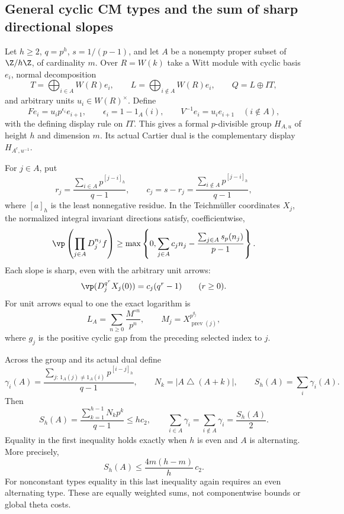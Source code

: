 \subsection{General cyclic CM types and the sum of sharp directional slopes}

\begin{theorem}\label{DP40}
Let $h\ge2$, $q=p^h$, $s=1/(p-1)$, and let $A$ be a nonempty proper subset of $\Z/h\Z$, of cardinality $m$. Over $R=W(k)$ take a Witt module with cyclic basis $e_i$, normal decomposition
\[
 T=\bigoplus_{i\in A}W(R)e_i,\qquad
 L=\bigoplus_{i\notin A}W(R)e_i,\qquad Q=L\oplus IT,
\]
and arbitrary units $u_i\in W(R)^\times$. Define
\[
 Fe_i=u_ip^{\epsilon_i}e_{i+1},\qquad
 \epsilon_i=1-1_A(i),\qquad
 V^{-1}e_i=u_ie_{i+1}\quad(i\notin A),
\]
with the defining display rule on $IT$. This gives a formal $p$-divisible group $H_{A,u}$ of height $h$ and dimension $m$. Its actual Cartier dual is the complementary display $H_{A^c,u^{-1}}$.

For $j\in A$, put
\[
 r_j=\frac{\sum_{i\in A}p^{[j-i]_h}}{q-1},\qquad
 c_j=s-r_j=\frac{\sum_{i\notin A}p^{[j-i]_h}}{q-1},
\]
where $[a]_h$ is the least nonnegative residue. In the Teichm\"uller coordinates $X_j$, the normalized integral invariant directions satisfy, coefficientwise,
\begin{equation}\label{eq:cyclicmixed}
 \vp\left(\prod_{j\in A}D_j^{n_j}f\right)
 \ge\max\left\{0,\sum_{j\in A}c_jn_j-
                   \frac{\sum_{j\in A}s_p(n_j)}{p-1}\right\}.
\end{equation}
Each slope is sharp, even with the arbitrary unit arrows:
\[
 \vp(D_j^{q^r}X_j(0))=c_j(q^r-1)\qquad(r\ge0).
\]
For unit arrows equal to one the exact logarithm is
\[
 L_A=\sum_{n\ge0}\frac{M^{\circ n}}{p^n},\qquad
 M_j=X_{\operatorname{prev}(j)}^{p^{g_j}},
\]
where $g_j$ is the positive cyclic gap from the preceding selected index to $j$.

Across the group and its actual dual define
\[
 \gamma_i(A)=\frac{\sum_{j:\,1_A(j)\ne1_A(i)}p^{[i-j]_h}}{q-1},
 \qquad N_k=|A\mathbin\triangle(A+k)|,\qquad
 S_h(A)=\sum_i\gamma_i(A).
\]
Then
\begin{equation}\label{eq:cyclicmax}
 S_h(A)=\frac{\sum_{k=1}^{h-1}N_kp^k}{q-1}
 \le h c_2,\qquad
 \sum_{i\in A}\gamma_i=\sum_{i\notin A}\gamma_i=\frac{S_h(A)}2.
\end{equation}
Equality in the first inequality holds exactly when $h$ is even and $A$ is alternating. More precisely,
\[
 S_h(A)\le \frac{4m(h-m)}h\,c_2.
\]
For nonconstant types equality in this last inequality again requires an even alternating type. These are equally weighted sums, not componentwise bounds or global theta costs.
\end{theorem}


